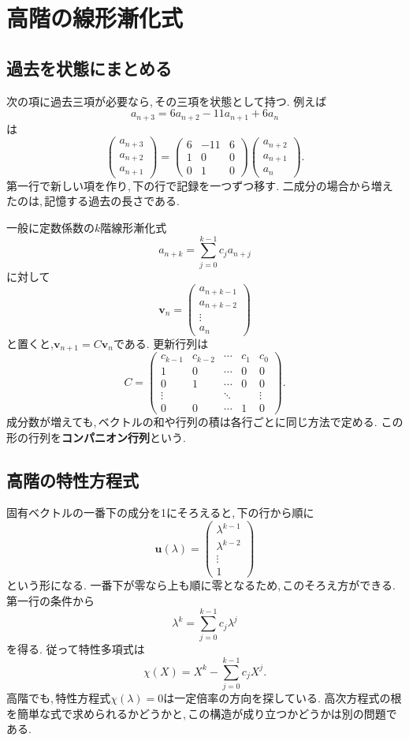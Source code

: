\section{高階の線形漸化式}\label{節：高階の線形漸化式}
\subsection{過去を状態にまとめる}

次の項に過去三項が必要なら,\,その三項を状態として持つ.
例えば
\[
 a_{n+3}=6a_{n+2}-11a_{n+1}+6a_n
\]
は
\[
 \begin{pmatrix}a_{n+3}\\a_{n+2}\\a_{n+1}\end{pmatrix}
 =
 \begin{pmatrix}6&-11&6\\1&0&0\\0&1&0\end{pmatrix}
 \begin{pmatrix}a_{n+2}\\a_{n+1}\\a_n\end{pmatrix}.
\]
第一行で新しい項を作り,\,下の行で記録を一つずつ移す.
二成分の場合から増えたのは,\,記憶する過去の長さである.

一般に定数係数の$k$階線形漸化式
\[
 a_{n+k}=\sum_{j=0}^{k-1}c_j a_{n+j}
\]
に対して
\[
 \boldsymbol v_n=
 \begin{pmatrix}a_{n+k-1}\\a_{n+k-2}\\\vdots\\a_n\end{pmatrix}
\]
と置くと,$\boldsymbol v_{n+1}=C\boldsymbol v_n$である.
更新行列は
\[
 C=
 \begin{pmatrix}
 c_{k-1}&c_{k-2}&\cdots&c_1&c_0\\
 1&0&\cdots&0&0\\
 0&1&\cdots&0&0\\
 \vdots&&\ddots&&\vdots\\
 0&0&\cdots&1&0
 \end{pmatrix}.
\]
成分数が増えても,\,ベクトルの和や行列の積は各行ごとに同じ方法で定める.
この形の行列を\textbf{コンパニオン行列}という.

\subsection{高階の特性方程式}

固有ベクトルの一番下の成分を1にそろえると,\,下の行から順に
\[
 \boldsymbol u(\lambda)=
 \begin{pmatrix}\lambda^{k-1}\\\lambda^{k-2}\\\vdots\\1\end{pmatrix}
\]
という形になる.
一番下が零なら上も順に零となるため,\,このそろえ方ができる.
第一行の条件から
\[
 \lambda^k=\sum_{j=0}^{k-1}c_j\lambda^j
\]
を得る. 従って特性多項式は
\[
 \chi(X)=X^k-\sum_{j=0}^{k-1}c_jX^j.
\]
高階でも,\,特性方程式$\chi(\lambda)=0$は一定倍率の方向を探している.
高次方程式の根を簡単な式で求められるかどうかと,\,この構造が成り立つかどうかは別の問題である.

